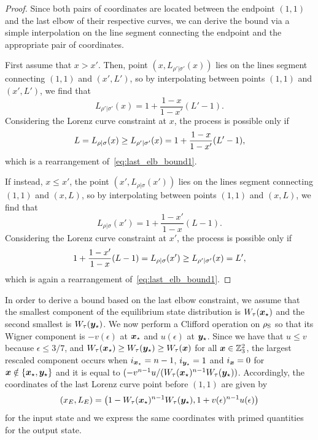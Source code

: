 \documentclass[pra,
aps,
twocolumn,
superscriptaddress,
groupedaddress,
nofootinbib,
reprint
]{revtex4-1}
\begin{document}
\begin{proof}
Since both pairs of coordinates are located between the endpoint $(1,1)$ and the last elbow of their respective curves, we can derive the bound via a simple interpolation on the line segment connecting the endpoint and the appropriate pair of coordinates.

First assume that $x > x'$.
Then, point $(x, L_{\rho'|\sigma'}(x))$ lies on the lines segment connecting $(1,1)$ and $(x', L')$, so by interpolating between points $(1,1)$ and $(x', L')$, we find that
\begin{equation}
	L_{\rho'|\sigma'}(x) = 1 + \frac{1-x}{1-x'} (L' - 1).
\end{equation}
Considering the Lorenz curve constraint at $x$, the process is possible only if 
\begin{equation}
	L = {L_{\rho|\sigma}}(x) \geq {L_{\rho'|\sigma'}}(x) = 1 + \frac{1-x}{1-x'} (L' - 1),
\end{equation}
which is a rearrangement of~\cref{eq:last_elb_bound1}.

If instead, $x \leq x'$, the point $(x', L_{\rho|\sigma}(x'))$ lies on the lines segment connecting $(1,1)$ and $(x, L)$, so by interpolating between points $(1,1)$ and $(x, L)$, we find that
\begin{equation}
	L_{\rho|\sigma}(x') = 1 + \frac{1-x'}{1-x} (L - 1).
\end{equation}
Considering the Lorenz curve constraint at $x'$, the process is possible only if 
\begin{equation}
	1 + \frac{1-x'}{1-x} (L - 1) = {L_{\rho|\sigma}}(x') \geq {L_{\rho'|\sigma'}}(x) = L',
\end{equation}
which is again a rearrangement of~\cref{eq:last_elb_bound1}.
\end{proof}

In order to derive a bound based on the last elbow constraint, we assume that the smallest component of the equilibrium state distribution is $W_{\tau}(\bm{x}_\star)$ and the second smallest is $W_{\tau}(\bm{y}_\star)$.
We now perform a Clifford operation on $\rho_{\rm{S}}$ so that its Wigner component is $-v(\epsilon)$ at $\bm{x}_\star$ and $u(\epsilon)$ at $\bm{y}_\star$. 
Since we have that $u \leq v$ because $\epsilon \leq 3/7$, and $W_{\tau}(\bm{x}_\star) \geq W_{\tau}(\bm{y}_\star) \geq W_{\tau}(\bm{x})$ for all $\bm{x} \in \mathbb{Z}_3^2$, the largest rescaled component occurs when $i_{\bm{x}_\star} = n-1$, $i_{\bm{y}_\star} = 1$ and $i_{\bm{x}} = 0$ for $\bm{x} \notin \{\bm{x}_\star, \bm{y}_\star\}$ and it is equal to $(-v^{n-1}u/(W_{\tau}(\bm{x}_\star)^{n-1}W_{\tau}(\bm{y}_\star))$.
Accordingly, the coordinates of the last Lorenz curve point before $(1,1)$ are given by
\begin{equation}
	(x_E, L_E) = \left( 1-W_{\tau}(\bm{x}_\star)^{n-1}W_{\tau}(\bm{y}_\star), 1 + v(\epsilon)^{n-1}u(\epsilon) \right)
\end{equation}
for the input state and we express the same coordinates with primed quantities for the output state.
\end{document}
